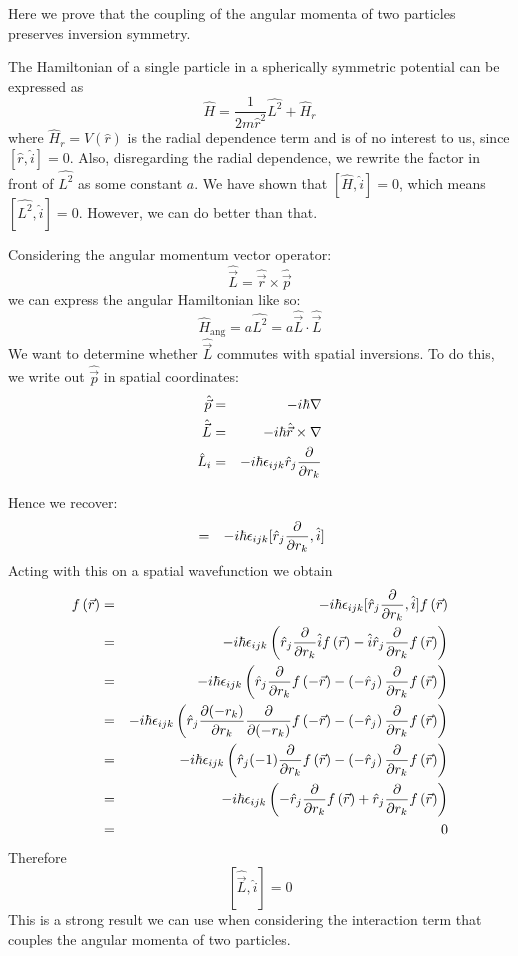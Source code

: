 \documentclass[12pt]{article}
\begin{document}
	Here we prove that the coupling of the angular momenta of two particles preserves inversion symmetry.
	
	The Hamiltonian of a single particle in a spherically symmetric potential can be expressed as
	$$\hat{H}=\frac{1}{2m\hat{r}^2}\hat{L^2}+\hat{H}_r$$
	where $\hat{H}_r=V(\hat{r})$ is the radial dependence term and is of no interest to us, since $[\hat{r}, \hat{i}]=0$. Also, disregarding the radial dependence, we rewrite the factor in front of $\hat{L^2}$ as some constant $a$. We have shown that $[\hat{H}, \hat{i}]=0$, which means $[\hat{L^2},\hat{i}]=0$. However, we can do better than that.
	
	Considering the angular momentum vector operator:
	$$\hat{\vec{L}}=\hat{\vec{r}}\times \hat{\vec{p}}$$
	we can express the angular Hamiltonian like so:
	$$\hat{H}_{\text{ang}}=a\hat{L^2}=a\hat{\vec{L}}\cdot\hat{\vec{L}}$$
	We want to determine whether $\hat{\vec{L}}$ commutes with spatial inversions. To do this, we write out $\hat{\vec{p}}$ in spatial coordinates:
	\begin{eqnarray*}
	\hat{\vec{p}}&=&-i\hbar \nabla\\
	\hat{\vec{L}}&=&-i\hbar \hat{\vec{r}}\times\nabla\\
	\hat{L}_i&=&-i\hbar\epsilon_{ijk}\hat{r}_j\pdv{r_k}
	\end{eqnarray*}
	
	Hence we recover:
	\begin{eqnarray*}
	[\hat{L}_i, \hat{i}]&=&-i\hbar\epsilon_{ijk}[\hat{r}_j\pdv{r_k}, \hat{i}]
	\end{eqnarray*}
	Acting with this on a spatial wavefunction we obtain
	\begin{eqnarray*}
	[\hat{L}_i, \hat{i}]f\left(\vec{r}\right)&=&-i\hbar\epsilon_{ijk}[\hat{r}_j\pdv{r_k}, \hat{i}]f\left(\vec{r}\right)\\
	&=&-i\hbar\epsilon_{ijk}\left(\hat{r}_j\pdv{r_k}\hat{i}f\left(\vec{r}\right)-\hat{i}\hat{r}_j\pdv{r_k}f\left(\vec{r}\right)\right)\\
	&=&-i\hbar\epsilon_{ijk}\left(\hat{r}_j\pdv{r_k}f\left(-\vec{r}\right)-\left(-\hat{r}_j\right)\pdv{r_k}f\left(\vec{r}\right)\right)\\
	&=&-i\hbar\epsilon_{ijk}\left(\hat{r}_j\pdv{(-r_k)}{r_k}\pdv{(-r_k)}f\left(-\vec{r}\right)-\left(-\hat{r}_j\right)\pdv{r_k}f\left(\vec{r}\right)\right)\\
	&=&-i\hbar\epsilon_{ijk}\left(\hat{r}_j(-1)\pdv{r_k}f\left(\vec{r}\right)-\left(-\hat{r}_j\right)\pdv{r_k}f\left(\vec{r}\right)\right)\\
	&=&-i\hbar\epsilon_{ijk}\left(-\hat{r}_j\pdv{r_k}f\left(\vec{r}\right)+\hat{r}_j\pdv{r_k}f\left(\vec{r}\right)\right)\\
	&=&0
	\end{eqnarray*}
	Therefore
	$$[\hat{\vec{L}},\hat{i}]=0$$
	This is a strong result we can use when considering the interaction term that couples the angular momenta of two particles.
	
\end{document}
